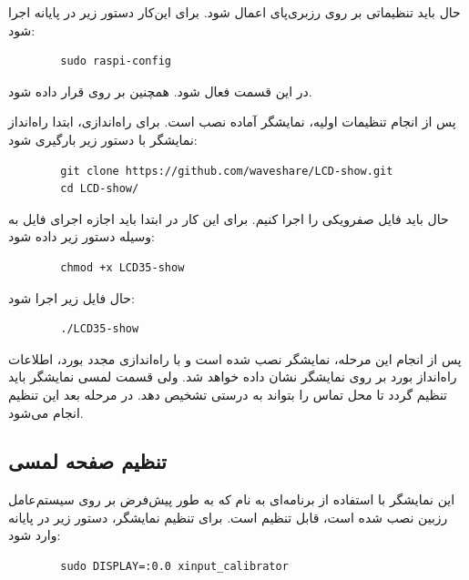 حال باید تنظیماتی بر روی رزبری‌پای اعمال شود. برای این‌کار دستور زیر در پایانه اجرا شود:
\begin{latin}
    \begin{lstlisting}
        sudo raspi-config
    \end{lstlisting}
\end{latin}

در این قسمت  فعال شود. همچنین  بر روی  قرار داده شود.

 پس از انجام تنظیمات اولیه، نمایشگر آماده نصب است. برای راه‌اندازی، ابتدا راه‌انداز نمایشگر با دستور زیر بارگیری شود:
\begin{latin}
    \begin{lstlisting}
        git clone https://github.com/waveshare/LCD-show.git
        cd LCD-show/
    \end{lstlisting}
\end{latin}

حال باید فایل صفرویکی  را اجرا کنیم. برای این کار در ابتدا‌ باید اجازه اجرای فایل به وسیله دستور زیر داده شود:
\begin{latin}
    \begin{lstlisting}
        chmod +x LCD35-show
    \end{lstlisting}
\end{latin}
حال فایل زیر اجرا شود:

\begin{latin}
    \begin{lstlisting}
        ./LCD35-show
    \end{lstlisting}
\end{latin}
پس از انجام این مرحله، نمایشگر نصب شده است و با راه‌اندازی مجدد بورد، اطلاعات راه‌انداز بورد بر روی نمایشگر نشان داده خواهد شد. ولی قسمت لمسی نمایشگر باید تنظیم گردد تا محل تماس را بتواند به درستی تشخیص دهد. در مرحله بعد این تنظیم انجام می‌شود.

\subsection{تنظیم صفحه لمسی}
این نمایشگر با استفاده از برنامه‌ای به نام  که به طور پیش‌فرض بر روی سیستم‌عامل رزبین نصب شده است، قابل تنظیم است. برای تنظیم نمایشگر، دستور زیر در پایانه وارد شود:

\begin{latin}
    \begin{lstlisting}
        sudo DISPLAY=:0.0 xinput_calibrator
    \end{lstlisting}
\end{latin}

